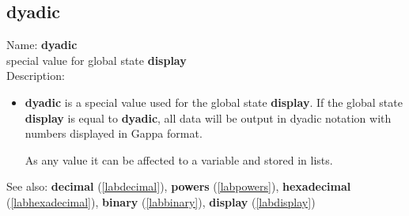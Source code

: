 \subsection{dyadic}
\label{labdyadic}
\noindent Name: \textbf{dyadic}\\
special value for global state \textbf{display}\\
\noindent Description: \begin{itemize}

\item \textbf{dyadic} is a special value used for the global state \textbf{display}.
   If the global state \textbf{display} is equal to \textbf{dyadic}, all data will
   be output in dyadic notation with numbers displayed in Gappa format.
    
   As any value it can be affected to a variable and stored in lists.
\end{itemize}
See also: \textbf{decimal} (\ref{labdecimal}), \textbf{powers} (\ref{labpowers}), \textbf{hexadecimal} (\ref{labhexadecimal}), \textbf{binary} (\ref{labbinary}), \textbf{display} (\ref{labdisplay})
